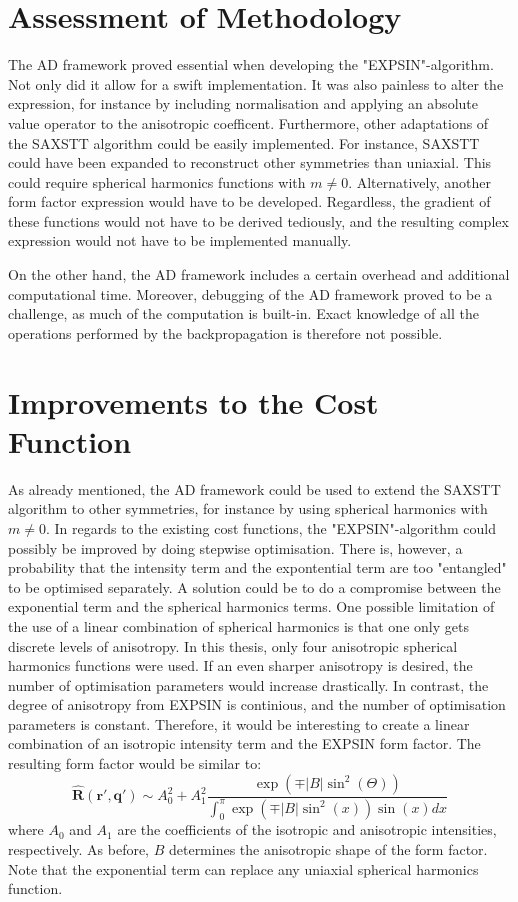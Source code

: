 \section{Assessment of Methodology}
\noindent
The AD framework proved essential when developing the "EXPSIN"-algorithm. Not only did it allow for a swift implementation.
It was also painless to alter the expression, for instance by including normalisation and applying an absolute value operator to the anisotropic coefficent.
Furthermore, other adaptations of the SAXSTT algorithm could be easily implemented. For instance, SAXSTT could have been expanded to reconstruct other symmetries than uniaxial.
This could require spherical harmonics functions with $m \neq 0$. Alternatively, another form factor expression would have to be developed.
Regardless, the gradient of these functions would not have to be derived tediously, and the resulting complex expression would not have to be implemented manually.

On the other hand, the AD framework includes a certain overhead and additional computational time. Moreover, debugging of the AD framework proved to be a challenge, as much of the computation is built-in.
Exact knowledge of all the operations performed by the backpropagation is therefore not possible.


\section{Improvements to the Cost Function}
As already mentioned, the AD framework could be used to extend the SAXSTT algorithm to other symmetries, for instance by using spherical harmonics with $m \neq 0$.
In regards to the existing cost functions, the "EXPSIN"-algorithm could possibly be improved by doing stepwise optimisation.
There is, however, a probability that the intensity term and the expontential term are too "entangled" to be optimised separately.
A solution could be to do a compromise between the exponential term and the spherical harmonics terms.
One possible limitation of the use of a linear combination of spherical harmonics is that one only gets discrete levels of anisotropy.
In this thesis, only four anisotropic spherical harmonics functions were used. If an even sharper anisotropy is desired, the number of optimisation parameters would increase drastically.
In contrast, the degree of anisotropy from EXPSIN is continious, and the number of optimisation parameters is constant.
Therefore, it would be interesting to create a linear combination of an isotropic intensity term and the EXPSIN form factor.
The resulting form factor would be similar to:
\begin{equation}
    \label{eq:form_factor_linear_combination}
    \bm{\widehat{R}}(\bm{r'}, \bm{q'}) \sim A_{0}^{2} + A_{1}^{2} \frac{\exp\left(\mp |B| \sin^2(\Theta) \right)} {\int_{0}^{\pi} \exp\left( \mp |B| \sin^{2}(x) \right) \sin(x) dx}
\end{equation}
\noindent
where $A_{0}$ and $A_{1}$ are the coefficients of the isotropic and anisotropic intensities, respectively. As before, $B$ determines the anisotropic shape of the form factor.
Note that the exponential term can replace any uniaxial spherical harmonics function.